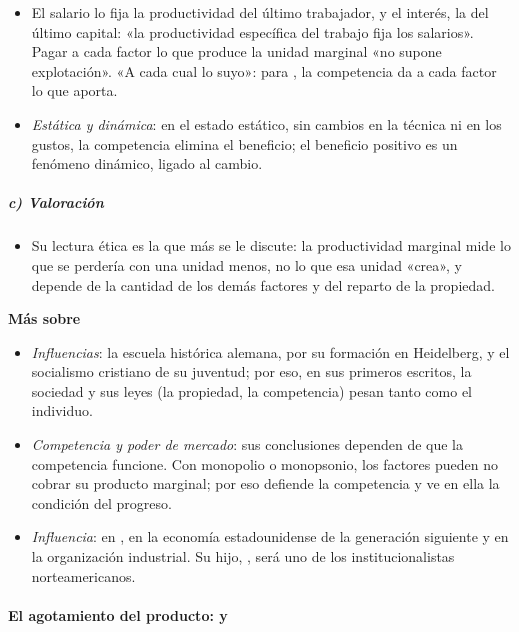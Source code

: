 \documentclass[11pt]{article}
\begin{document}
\begin{itemize}
\item El salario lo fija la productividad del último trabajador, y el interés, la del último capital: «la productividad específica del trabajo fija los salarios»\nocite{Clark1899Distribution}. Pagar a cada factor lo que produce la unidad marginal «no supone explotación»\nocite{Clark1899Distribution}. «A cada cual lo suyo»: para , la competencia da a cada factor lo que aporta.
\item \emph{Estática y dinámica}: en el estado estático, sin cambios en la técnica ni en los gustos, la competencia elimina el beneficio; el beneficio positivo es un fenómeno dinámico, ligado al cambio.
\end{itemize}

\subparagraph{c) Valoración}

\begin{itemize}
\item Su lectura ética es la que más se le discute: la productividad marginal mide lo que se perdería con una unidad menos, no lo que esa unidad «crea», y depende de la cantidad de los demás factores y del reparto de la propiedad.
\end{itemize}

\begin{anotaciones}
\textbf{Más sobre }
\begin{itemize}
\item \emph{Influencias}: la escuela histórica alemana, por su formación en Heidelberg, y el socialismo cristiano de su juventud; por eso, en sus primeros escritos, la sociedad y sus leyes (la propiedad, la competencia) pesan tanto como el individuo.
\item \emph{Competencia y poder de mercado}: sus conclusiones dependen de que la competencia funcione. Con monopolio o monopsonio, los factores pueden no cobrar su producto marginal; por eso defiende la competencia y ve en ella la condición del progreso.
\item \emph{Influencia}: en , en la economía estadounidense de la generación siguiente y en la organización industrial. Su hijo, , será uno de los institucionalistas norteamericanos.
\end{itemize}
\end{anotaciones}

\paragraph{El agotamiento del producto:  y }
\end{document}
